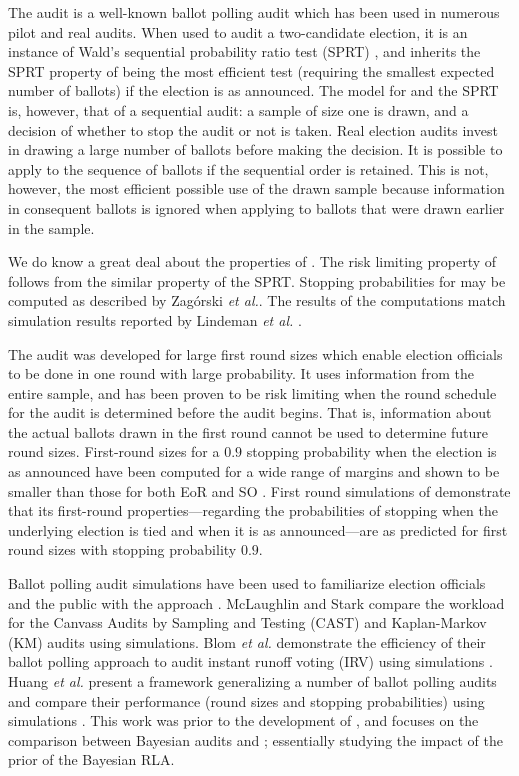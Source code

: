 The \BRAVO audit \cite{bravo} is a well-known ballot polling audit which has been used in numerous pilot and real audits. When used to audit a two-candidate election, it is an instance of Wald's sequential probability ratio test (SPRT) \cite{wald}, and inherits the SPRT property of being the most efficient test (requiring the smallest expected number of ballots) if the election is as announced. The model for \BRAVO and the SPRT is, however, that of a sequential audit: a sample of size one is drawn, and a decision of whether to stop the audit or not is taken. Real election audits invest in drawing a large number of ballots before making the decision. It is possible to apply \BRAVO to the sequence of ballots if the sequential order is retained. This is not, however, the most efficient possible use of the drawn sample because information in consequent ballots is ignored when applying \BRAVO to ballots that were drawn earlier in the sample. 

We do know a great deal about the properties of \BRAVO. The risk limiting property of \BRAVO follows from the similar property of the SPRT. Stopping probabilities for \BRAVO may be computed as described by Zag{\'o}rski {\em et al.}\cite{usenix_minerva,arxiv_athena}. The results of the computations match simulation results reported by Lindeman {\em et al.} \cite[Table 1]{bravo}.  

The \Minerva audit \cite{usenix_minerva,arxiv_athena} was developed for large first round sizes which enable election officials to be done in one round with large probability. It uses information from the entire sample, and has been proven to be risk limiting when the round schedule for the audit is determined before the audit begins. That is, information about the actual ballots drawn in the first round cannot be used to determine future round sizes. First-round sizes for a $0.9$ stopping probability when the election is as announced have been computed for a wide range of margins and shown to be smaller than those for both EoR and SO \BRAVO. First round simulations of \Minerva \cite{arxiv_athena} demonstrate that its first-round properties---regarding the probabilities of stopping when the underlying election is tied and when it is as announced---are as predicted for first round sizes with stopping probability $0.9$. 

Ballot polling audit simulations have been used to familiarize election officials and the public with the approach \cite{dice}. McLaughlin and Stark \cite{mclaughlin_thesis,simulations_house} compare the workload for the Canvass Audits by Sampling and Testing (CAST) and Kaplan-Markov (KM) audits using simulations. Blom {\em et al.} demonstrate the efficiency of their ballot polling approach to audit instant runoff voting (IRV) using simulations \cite{blom_IRV}. Huang {\em et al.} present a framework generalizing a number of ballot polling audits and compare their performance (round sizes and stopping probabilities) using simulations \cite{DBLP:conf/evoteid/HuangRSTV20}. This work was prior to the development of \Minerva, and focuses on the comparison between Bayesian audits \cite{bayesian-audits} and \BRAVO; essentially studying the impact of the prior of the Bayesian RLA. 